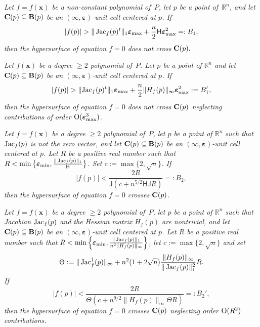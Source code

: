\documentclass[10pt]{article}
\newcommand{\x}{{\bm x}}
\newcommand\R{{\mathbb R}}
\newcommand{\epsbold}{{\bm \varepsilon}}
\def\Jac{\mathop{\rm Jac}\nolimits}
\newtheorem{prop}[theorem]{Proposition}
\begin{document}
\bigskip
\bigskip
\bigskip
{\em Let $f=f(\x)$ be a non-constant polynomial of~$P$,
let $p$ be a point of~$\R^n$, and let ${\bf C}(p) \subseteq {\bf B}(p)$
be an $(\infty,\epsbold)$-unit cell   centered at $p$. If
$$
| f(p)| > \|\Jac_f(p)^t\|_1 \epsbold_{\rm max} +\frac{n}{2}{\mathsf H} \epsbold_{\rm max}^2 =:B_1,
$$
then the hypersurface  of equation $f=0$ does not cross ${\bf C}(p).$
}
\bigskip

{\em Let $f(\x)$ be a degree $\geq 2$   polynomial of~$P$.
Let $p$ be a point of $\R^n$ and let
${\bf C}(p) \subseteq {\bf B}(p)$
be an $(\infty,\epsbold)$-unit cell  centered at $p$. If
$$
|f(p)| > \|{\rm Jac}_f(p)^t\|_1 \epsbold_{\rm max} + \frac{n}{2}  \|H_f(p)\|_\infty \epsbold_{\rm max}^2:=B_1',
$$
then  the hypersurface of equation $f=0$ does not cross ${\bf C}(p)$ neglecting contributions of order ${\rm O}(\epsbold_{\rm max} ^3)$.
}
\bigskip

{\em Let $f=f(\x)$ be a degree $\geq 2$ polynomial of~$P$,
let $p$ be a point of $\R^n$ such that $\Jac_f(p)$ is not the zero vector, 
and let ${\bf C}(p) \subseteq {\bf B}(p)$
be an $(\infty,\epsbold)$-unit cell  centered at $p$.
Let $R$ be a positive real number such that 
$R < \min \big\{\epsbold_{\rm min}, \frac{\|\Jac_f(p)\|_1}{{\mathsf H}}\big\}$.
Set $c:=\max\{2, \sqrt{n}\}$. If 
$$
|f(p)| < \frac{2R}{\mathsf J(c+ n^{5/2}{\mathsf H} {\mathsf J} R)}  =: B_2,
$$
then the hypersurface of equation $f=0$ crosses ${\bf C}(p)$.
}

\bigskip
{\em Let $f=f(\x)$ be a degree $\geq 2$ polynomial of~$P$,
let $p$ be a point of $\R^n$ such that  Jacobian $\Jac_f(p)$ and the Hessian matrix $H_f(p)$ are nontrivial, 
and let ${\bf C}(p) \subseteq {\bf B}(p)$
be an $(\infty,\epsbold)$-unit cell  centered at $p$.
Let $R$ be a positive real number such that
$R < \min \left \{\epsbold_{\rm min}, \frac{\|\Jac_f(p)\|_1}{n^2 \|H_f(p)\|_\infty} \right\}$, 
let $c:=\max\{2, \sqrt{n}\}$ and set 
$$
\Theta:=  \|\Jac_f^\dagger(p)\|_\infty+  n^2(1+2 \sqrt{n}) \frac{\|H_f(p)\|_\infty}{\|\Jac_f(p)\|_1^2} R.
$$
If 
\begin{equation*}
|f(p)| < \frac{2R}{\Theta (c+  n^{9/2} \|H_f(p)\|_\infty \Theta R)} =:B_2',
\end{equation*}
then the hypersurface of equation $f=0$ crosses ${\bf C}(p)$  neglecting order ${\rm O}(R^2)$ contributions.
}
\bigskip
\end{document}
